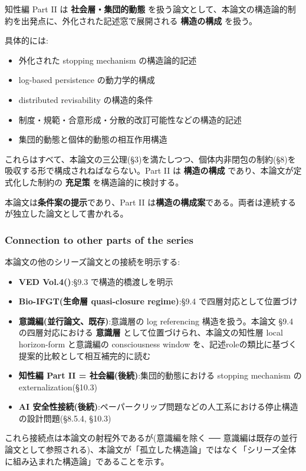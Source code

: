 知性編 Part II は \textbf{社会層・集団的動態} を扱う論文として、本論文の構造論的制約を出発点に、外化された記述窓で展開される \textbf{構造の構成} を扱う。

具体的には:

\begin{itemize}
\item 外化された stopping mechanism の構造論的記述
\item log-based persistence の動力学的構成
\item distributed revisability の構造的条件
\item 制度・規範・合意形成・分散的改訂可能性などの構造的記述
\item 集団的動態と個体的動態の相互作用構造
\end{itemize}

これらはすべて、本論文の三公理(\S{}3)を満たしつつ、個体内非閉包の制約(\S{}8)を吸収する形で構成されねばならない。Part II は \textbf{構造の構成} であり、本論文が定式化した制約の \textbf{充足策} を構造論的に検討する。

本論文は\textbf{条件案の提示}であり、Part II は\textbf{構造の構成案}である。両者は連続するが独立した論文として書かれる。

\subsubsection{Connection to other parts of the series}


本論文の他のシリーズ論文との接続を明示する:

\begin{itemize}
\item \textbf{VED Vol.4(\DH{})}:\S{}9.3 で構造的橋渡しを明示
\item \textbf{Bio-IFGT(生命層 quasi-closure regime)}:\S{}9.4 で四層対応として位置づけ
\item \textbf{意識編(並行論文、既存)}:意識層の log referencing 構造を扱う。本論文 \S{}9.4 の四層対応における \textbf{意識層} として位置づけられ、本論文の知性層 local horizon-form と意識編の consciousness window を、記述roleの類比に基づく提案的比較として相互補完的に読む
\item \textbf{知性編 Part II = 社会編(後続)}:集団的動態における stopping mechanism の externalization(\S{}10.3)
\item \textbf{AI 安全性接続(後続)}:ペーパークリップ問題などの人工系における停止構造の設計問題(\S{}8.5.4, \S{}10.3)
\end{itemize}

これら接続点は本論文の射程外であるが(意識編を除く ── 意識編は既存の並行論文として参照される)、本論文が「孤立した構造論」ではなく「シリーズ全体に組み込まれた構造論」であることを示す。

